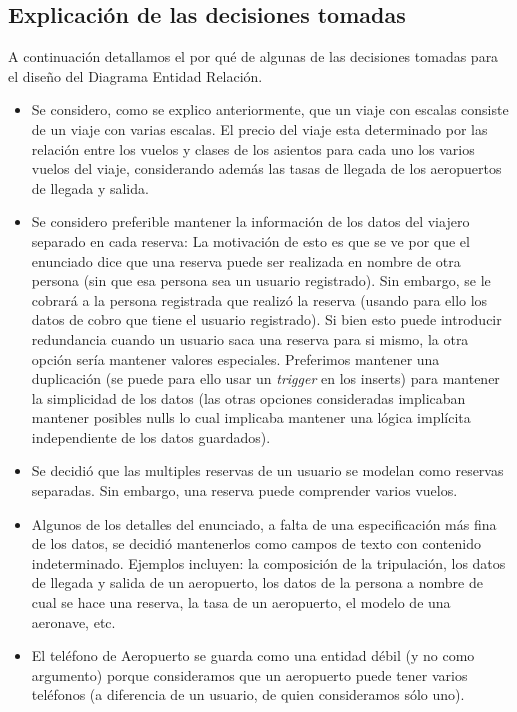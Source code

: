 \subsection{Explicaci\'on de las decisiones tomadas}

A continuaci\'on detallamos el por qu\'e de algunas de las decisiones tomadas para el diseño del Diagrama Entidad Relaci\'on.

\begin{itemize}
	\item Se considero, como se explico anteriormente, que un viaje con escalas consiste de un viaje con varias escalas. El
	precio del viaje esta determinado por las relaci\'on entre los vuelos y clases de los asientos para cada uno los varios 
	vuelos del viaje, considerando adem\'as las tasas de llegada de los aeropuertos de llegada y salida.
	\item Se considero preferible mantener la informaci\'on de los datos del viajero separado en cada reserva: La motivaci\'on
	de esto es que se ve por que el enunciado dice que una reserva puede ser realizada en nombre de otra persona (sin que esa
	persona sea un usuario registrado). Sin embargo, se le cobrar\'a a la persona registrada que realiz\'o la reserva (usando
	para ello los datos de cobro que tiene el usuario registrado). Si bien esto puede introducir redundancia cuando un usuario
	saca una reserva para si mismo, la otra opci\'on ser\'ia mantener valores especiales. Preferimos mantener una duplicaci\'on
	(se puede para ello usar un \textit{trigger} en los inserts) para mantener la simplicidad de los datos (las otras opciones
	consideradas implicaban mantener posibles nulls lo cual implicaba mantener una l\'ogica impl\'icita independiente de los
	datos guardados).
	\item Se decidi\'o que las multiples reservas de un usuario se modelan como reservas separadas. Sin embargo, una reserva
	puede comprender varios vuelos.
	\item Algunos de los detalles del enunciado, a falta de una especificaci\'on m\'as fina de los datos, se decidi\'o mantenerlos
	como campos de texto con contenido indeterminado. Ejemplos incluyen: la composici\'on de la tripulaci\'on, los datos de llegada
	y salida de un aeropuerto, los datos de la persona a nombre de cual se hace una reserva, la tasa de un aeropuerto, el modelo
	de una aeronave, etc.
	\item El teléfono de Aeropuerto se guarda como una entidad débil (y no como argumento) porque consideramos que un aeropuerto puede tener varios teléfonos (a diferencia de un usuario, de quien consideramos sólo uno).
\end{itemize}	
